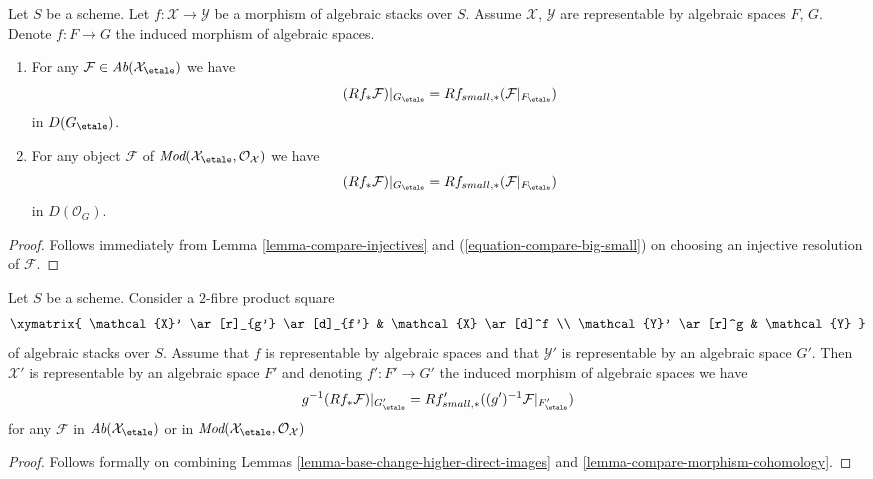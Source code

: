 \begin{lemma}
\label{lemma-compare-morphism-cohomology}
Let $S$ be a scheme. Let $f : \mathcal{X} \to \mathcal{Y}$ be a morphism
of algebraic stacks over $S$. Assume $\mathcal{X}$, $\mathcal{Y}$ are
representable by algebraic spaces $F$, $G$. Denote $f : F \to G$ the
induced morphism of algebraic spaces.
\begin{enumerate}
\item For any $\mathcal{F} \in \textit{Ab}(\mathcal{X}_\etale)$
we have
$$
(Rf_*\mathcal{F})|_{G_\etale} =
Rf_{small, *}(\mathcal{F}|_{F_\etale})
$$
in $D(G_\etale)$.
\item For any object $\mathcal{F}$ of
$\textit{Mod}(\mathcal{X}_\etale, \mathcal{O}_\mathcal{X})$
we have
$$
(Rf_*\mathcal{F})|_{G_\etale} =
Rf_{small, *}(\mathcal{F}|_{F_\etale})
$$
in $D(\mathcal{O}_G)$.
\end{enumerate}
\end{lemma}

\begin{proof}
Follows immediately from
Lemma \ref{lemma-compare-injectives}
and (\ref{equation-compare-big-small})
on choosing an injective resolution of $\mathcal{F}$.
\end{proof}

\begin{lemma}
\label{lemma-compare-representable-morphism-cohomology}
Let $S$ be a scheme. Consider a $2$-fibre product square
$$
\xymatrix{
\mathcal{X}' \ar[r]_{g'} \ar[d]_{f'} & \mathcal{X} \ar[d]^f \\
\mathcal{Y}' \ar[r]^g & \mathcal{Y}
}
$$
of algebraic stacks over $S$. Assume that $f$ is representable by algebraic
spaces and that $\mathcal{Y}'$ is representable by an algebraic space $G'$.
Then $\mathcal{X}'$ is representable by an algebraic space $F'$ and
denoting $f' : F' \to G'$ the induced morphism of algebraic spaces
we have
$$
g^{-1}(Rf_*\mathcal{F})|_{G'_\etale} =
Rf'_{small, *}((g')^{-1}\mathcal{F}|_{F'_\etale})
$$
for any $\mathcal{F}$ in $\textit{Ab}(\mathcal{X}_\etale)$
or in
$\textit{Mod}(\mathcal{X}_\etale, \mathcal{O}_\mathcal{X})$
\end{lemma}

\begin{proof}
Follows formally on combining
Lemmas \ref{lemma-base-change-higher-direct-images} and
\ref{lemma-compare-morphism-cohomology}.
\end{proof}











